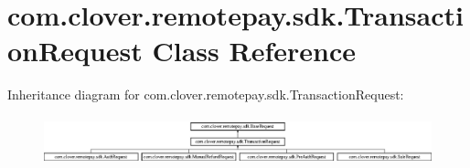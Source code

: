 \hypertarget{classcom_1_1clover_1_1remotepay_1_1sdk_1_1_transaction_request}{}\section{com.\+clover.\+remotepay.\+sdk.\+Transaction\+Request Class Reference}
\label{classcom_1_1clover_1_1remotepay_1_1sdk_1_1_transaction_request}


 


Inheritance diagram for com.\+clover.\+remotepay.\+sdk.\+Transaction\+Request\+:\begin{figure}[H]
\begin{center}
\leavevmode
\includegraphics[height=1.404682cm]{classcom_1_1clover_1_1remotepay_1_1sdk_1_1_transaction_request}
\end{center}
\end{figure}

